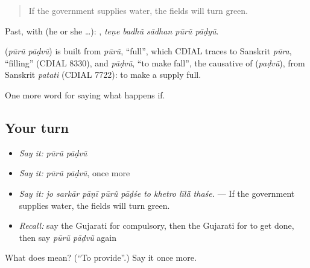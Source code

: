 \begin{quote}
If the government supplies water, the fields will turn green.
\end{quote}

Past, with  (he or she …):     , \emph{teṇe badhũ sādhan pūrũ pāḍyũ}.

\begin{cousinweb}
\textbf{ } (\emph{pūrũ pāḍvũ}) is built from \emph{pūrũ}, \textquotedblleft{}full\textquotedblright{}, which CDIAL traces to Sanskrit \emph{pūra}, \textquotedblleft{}filling\textquotedblright{} (CDIAL 8330), and \emph{pāḍvũ}, \textquotedblleft{}to make fall\textquotedblright{}, the causative of \textbf{} (\emph{paḍvũ}), from Sanskrit \emph{patati} (CDIAL 7722): to make a supply full.
\end{cousinweb}

\begin{grammarlens}[title={What you've built}]
One more word for saying what happens if.
\end{grammarlens}

\subsection*{Your turn}
\begin{itemize}
\raggedright
  \item \emph{Say it:} \emph{pūrũ pāḍvũ}
  \item \emph{Say it:} \emph{pūrũ pāḍvũ}, once more
  \item \emph{Say it:} \emph{jo sarkār pāṇī pūrũ pāḍśe to khetro līlā̃ thaśe.} — If the government supplies water, the fields will turn green.
  \item \emph{Recall:} say the Gujarati for compulsory, then the Gujarati for to get done, then say \emph{pūrũ pāḍvũ} again
\end{itemize}

\begin{tcolorbox}[breakable,colback=teal!4,colframe=teal!35!black,title={Before you move on}]
What does   mean? (\textquotedblleft{}To provide\textquotedblright{}.) Say it once more.
\end{tcolorbox}
